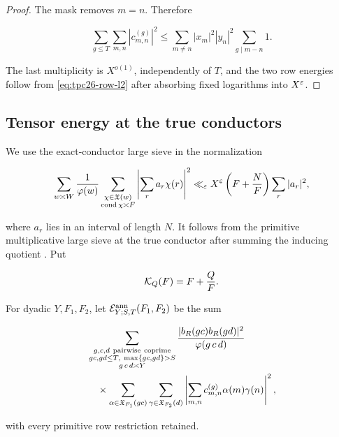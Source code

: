 \begin{proof}
The mask removes \(m=n\).  Therefore

\[
 \sum_{g\le T}\sum_{m,n}|c_{m,n}^{(g)}|^2
 \le
 \sum_{m\ne n}|x_m|^2|y_n|^2
 \sum_{g\mid m-n}1.
\]

The last multiplicity is \(X^{o(1)}\), independently of \(T\), and
the two row energies follow from
\eqref{eq:tpc26-row-l2} after absorbing fixed logarithms into
\(X^\varepsilon\).
\end{proof}

\subsection{Tensor energy at the true conductors}

We use the exact-conductor large sieve in the normalization

\begin{equation}
 \sum_{w\asymp W}\frac1{\varphi(w)}
 \sum_{\substack{\chi\in\mathfrak X(w)\\\operatorname{cond}\chi\asymp F}}
 \left|\sum_ra_r\chi(r)\right|^2
 \ll_\varepsilon X^\varepsilon
 \left(F+\frac NF\right)\sum_r|a_r|^2,
 \label{eq:tpc26-exact-conductor-LS}
\end{equation}

where \(a_r\) lies in an interval of length \(N\).  It follows from the
primitive multiplicative large sieve at the true conductor after
summing the inducing quotient \citep{IwaniecKowalski2004,WangTPC22}.
Put

\begin{equation}
 \mathcal K_Q(F)=F+\frac QF.
 \label{eq:tpc26-KQ}
\end{equation}

For dyadic \(Y,F_1,F_2\), let
\(\mathcal E^{\rm ann}_{Y;S,T}(F_1,F_2)\) be the sum

\begin{align}
 &\sum_{\substack{g,c,d\ \mathrm{pairwise\ coprime}\\
                  gc,gd\le T,\ \max\{gc,gd\}>S\\
                  g\,c\,d\asymp Y}}
 \frac{|b_R(gc)b_R(gd)|^2}{\varphi(g\,c\,d)}
 \notag\\
 &\quad\times
 \sum_{\alpha\in\mathfrak X_{F_1}(gc)}
 \sum_{\gamma\in\mathfrak X_{F_2}(d)}
 \left|
 \sum_{m,n}c_{m,n}^{(g)}\alpha(m)\gamma(n)
 \right|^2,
 \label{eq:tpc26-annular-energy}
\end{align}

with every primitive row restriction retained.

